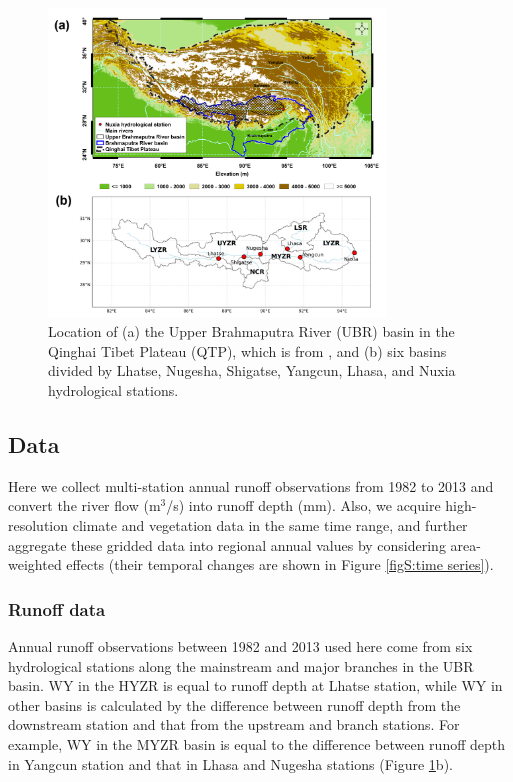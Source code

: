 \documentclass[hess, manuscript]{copernicus}
\begin{document}
\begin{figure}[ht]
    \includegraphics[width=0.8\textwidth]{02-figures/Figure1.png}
    \caption{Location of (a) the Upper Brahmaputra River (UBR) basin in the Qinghai Tibet Plateau (QTP), which is from \citet{li2021vegetation}, and (b) six basins divided by Lhatse, Nugesha, Shigatse, Yangcun, Lhasa, and Nuxia hydrological stations.}
    \label{fig:location}
\end{figure}

\subsection{Data}
Here we collect multi-station annual runoff observations from 1982 to 2013 and convert the river flow (m$^{3}$/s) into runoff depth (mm). Also, we acquire high-resolution climate and vegetation data in the same time range, and further aggregate these gridded data into regional annual values by considering area-weighted effects (their temporal changes are shown in Figure \ref{figS:time series}).

\subsubsection{Runoff data}
Annual runoff observations between 1982 and 2013 used here come from six hydrological stations along the mainstream and major branches in the UBR basin. WY in the HYZR is equal to runoff depth at Lhatse station, while WY in other basins is calculated by the difference between runoff depth from the downstream station and that from the upstream and branch stations. For example, WY in the MYZR basin is equal to the difference between runoff depth in Yangcun station and that in Lhasa and Nugesha stations (Figure \ref{fig:location}b).
\end{document}
